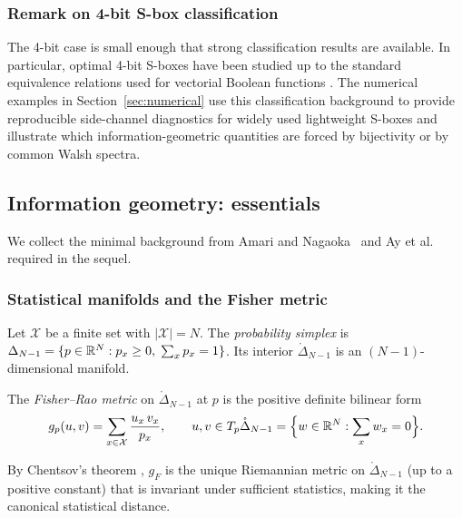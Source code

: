 \subsubsection{Remark on 4-bit S-box classification}

The 4-bit case is small enough that strong classification results are
available.  In particular, optimal 4-bit S-boxes have been studied up to the
standard equivalence relations used for vectorial Boolean functions
\cite{leander2007classification}.  The numerical examples in
Section~\ref{sec:numerical} use this classification background to provide
reproducible side-channel diagnostics for widely used lightweight S-boxes and
illustrate which information-geometric quantities are forced by bijectivity or
by common Walsh spectra.

\subsection{Information geometry: essentials}\label{subsec:ig}

We collect the minimal background from
Amari and Nagaoka~\cite{amari2000methods}
and Ay et al.~\cite{ay2017information} required in the sequel.

\subsubsection{Statistical manifolds and the Fisher metric}

Let $\mathcal{X}$ be a finite set with $|\mathcal{X}|=N$.
The \emph{probability simplex} is
$\Delta_{N-1} = \{p\in\mathbb{R}^N : p_x\geq 0,\; \sum_x p_x = 1\}$.
Its interior $\mathring{\Delta}_{N-1}$ is an $(N-1)$-dimensional manifold.

\begin{definition}\label{def:fisher-rao}
The \emph{Fisher--Rao metric} on $\mathring{\Delta}_{N-1}$ at $p$ is the positive
definite bilinear form
\begin{equation}\label{eq:fisher-rao}
  g_p(u,v) = \sum_{x\in\mathcal{X}} \frac{u_x\,v_x}{p_x},
  \qquad u,v\in T_p\mathring{\Delta}_{N-1} = \Bigl\{w\in\mathbb{R}^N : \sum_x w_x = 0\Bigr\}.
\end{equation}
\end{definition}

By Chentsov's theorem \cite{chentsov1982statistical}, $g_F$ is the unique
Riemannian metric on $\mathring{\Delta}_{N-1}$ (up to a positive constant) that is
invariant under sufficient statistics, making it the canonical statistical
distance.

